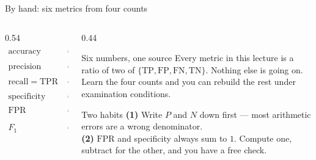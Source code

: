 \documentclass[aspectratio=169]{beamer}
\newcommand{\TP}{\mathrm{TP}}
\newcommand{\FP}{\mathrm{FP}}
\newcommand{\TN}{\mathrm{TN}}
\newcommand{\FN}{\mathrm{FN}}
\newcommand{\TPR}{\mathrm{TPR}}
\newcommand{\FPR}{\mathrm{FPR}}
\begin{document}
\begin{frame}[shrink=9]{By hand: six metrics from four counts}
  \begin{columns}[T]
    \begin{column}{0.54\textwidth}
      \small
      \begin{align*}
        \text{accuracy} &= \frac{\TP + \TN}{P + N} = \frac{6+8}{20} = 0.7000\\
        \text{precision} &= \frac{\TP}{\TP + \FP} = \frac{6}{8} = 0.7500\\
        \text{recall} = \TPR &= \frac{\TP}{P} = \frac{6}{10} = 0.6000\\
        \text{specificity} &= \frac{\TN}{N} = \frac{8}{10} = 0.8000\\
        \FPR &= \frac{\FP}{N} = \frac{2}{10} = 0.2000\\
        F_1 &= \frac{2pr}{p + r} = \frac{2(0.75)(0.60)}{1.35}
          = \frac{0.9}{1.35} = 0.6667
      \end{align*}
    \end{column}
    \begin{column}{0.44\textwidth}
      \begin{block}{Six numbers, one source}
        \footnotesize Every metric in this lecture is a ratio of two of
        $\{\TP, \FP, \FN, \TN\}$. Nothing else is going on. Learn the four
        counts and you can rebuild the rest under examination conditions.
      \end{block}
      \begin{alertblock}{Two habits}
        \footnotesize \textbf{(1)} Write $P$ and $N$ down first --- most
        arithmetic errors are a wrong denominator.\\[0.3em]
        \textbf{(2)} $\FPR$ and specificity always sum to $1$. Compute one,
        subtract for the other, and you have a free check.
      \end{alertblock}
    \end{column}
  \end{columns}
\end{frame}
\end{document}
